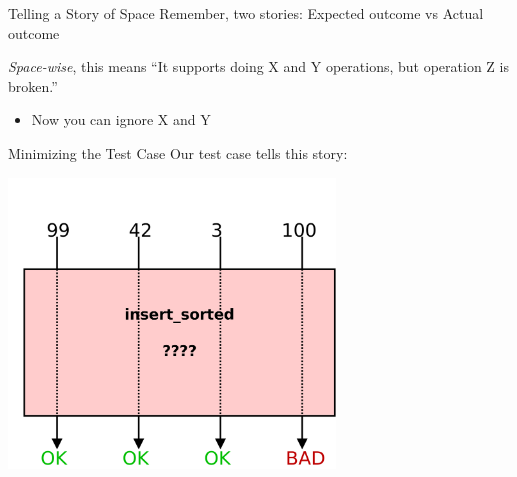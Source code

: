\documentclass[xcolor=dvipsnames]{beamer}
\begin{document}

\begin{frame}{Telling a Story of Space}
	Remember, two stories: Expected outcome vs Actual outcome

	\linegap
	{\em Space-wise}, this means ``It supports doing X and Y operations, but operation Z is broken.''
	\begin{itemize}
		\item Now you can ignore X and Y
	\end{itemize}
\end{frame}

\begin{frame}{Minimizing the Test Case}
	Our test case tells this story:

	\begin{center}
	\includegraphics[width=0.65\textwidth]{space0.png}
	\end{center}
\end{frame}
\end{document}

